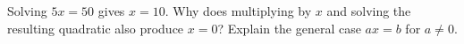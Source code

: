 Solving $5x=50$ gives $x=10$. Why does multiplying by $x$ and solving the resulting quadratic also produce $x=0$? Explain the general case $ax=b$ for $a\ne0$.
